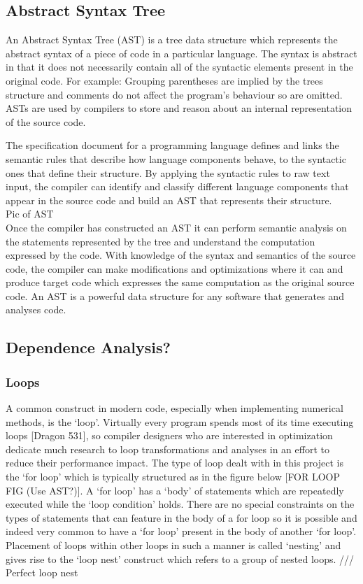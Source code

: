 \documentclass[a4paper,12pt,twoside]{report}
\begin{document}
\begin{itemize}
\subsection{Abstract Syntax Tree}
An Abstract Syntax Tree (AST) is a tree data structure which represents the abstract syntax of a piece of
code in a particular language. The syntax is abstract in that it does not necessarily contain all of the
syntactic elements present in the original code. For example: Grouping parentheses are implied by the
trees structure and comments do not affect the program's behaviour so are omitted. ASTs are used 
by compilers to store and reason about an internal representation of the source code.

The specification document for a programming language defines and links the semantic rules that describe 
how language components behave, to the syntactic ones that define their structure. 
By applying the syntactic rules to raw text input, the compiler can identify and classify different 
language components that appear in the source code and build an AST that represents their structure.
\\
Pic of AST
\\
Once the compiler has constructed an AST it can perform semantic analysis on the statements represented
by the tree and understand the computation expressed by the code. With knowledge of the syntax and 
semantics of the source code, the compiler can make modifications and optimizations where it can and produce 
target code which expresses the same computation as the original source code. An AST is a powerful
data structure for any software that generates and analyses code.

\subsection{Dependence Analysis?}

\subsubsection{Loops}
A common construct in modern code, especially when implementing numerical methods, is the `loop'. Virtually every program spends most of its 
time executing loops [Dragon 531], so compiler designers who are interested in optimization dedicate much research to 
loop transformations and analyses in an effort to reduce their performance impact. The type of loop dealt with in this project is the
`for loop' which is typically structured as in the figure below [FOR LOOP FIG (Use AST?)]. A `for loop' has a `body' of statements which are repeatedly executed
while the `loop condition' holds. There are no special constraints on the types of statements that can feature in the body of a for loop so it
is possible and indeed very common to have a `for loop' present in the body of another `for loop'. Placement of loops within other loops in such a manner
	is called `nesting' and gives rise to the `loop nest' construct which refers to a group of nested loops. /// Perfect loop nest


\end{itemize}
\end{document}
